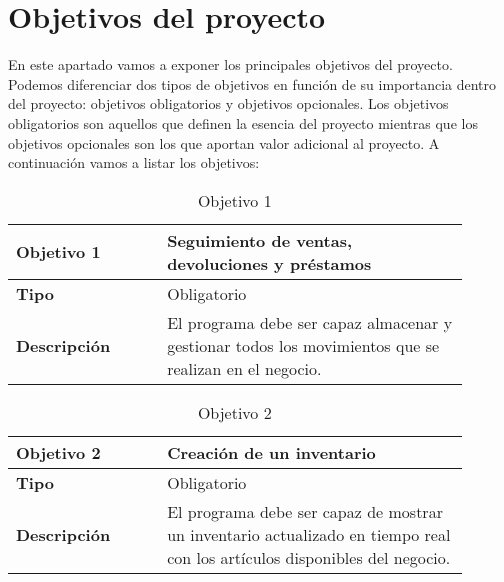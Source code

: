 \section{Objetivos del proyecto}
\label{sec:project_objectives}
En este apartado vamos a exponer los principales objetivos del proyecto. Podemos diferenciar dos tipos de objetivos en función de su importancia dentro del proyecto: objetivos obligatorios y objetivos opcionales. Los objetivos obligatorios son aquellos que definen la esencia del proyecto mientras que los objetivos opcionales son los que aportan valor adicional al proyecto. A continuación vamos a listar los objetivos: 



\begin{table}[htb!]
	\centering %
	\begin{tabular}{|p{0.3\linewidth}|p{0.6\linewidth}|}
		\hline
		\rowcolor{grayshade} \textbf{Objetivo 1} & \textbf{Seguimiento de ventas, devoluciones y préstamos} \\
		\hline
		\textbf{Tipo} & Obligatorio \\
		\hline
		\textbf{Descripción} & El programa debe ser capaz almacenar y gestionar todos los movimientos que se realizan en el negocio. \\
		\hline
	\end{tabular}
	\caption{Objetivo 1}
\end{table}

\begin{table}[htb!]
	\centering %
	\begin{tabular}{|p{0.3\linewidth}|p{0.6\linewidth}|}
		\hline %
		\rowcolor{grayshade} 
		\textbf{Objetivo 2} & \textbf{Creación de un inventario} \\
		\hline %
		\textbf{Tipo} & Obligatorio \\
		\hline
		\textbf{Descripción} & El programa debe ser capaz de mostrar un inventario actualizado en tiempo real con los artículos disponibles del negocio. \\
		\hline
	\end{tabular}
	\caption{Objetivo 2}
\end{table}

